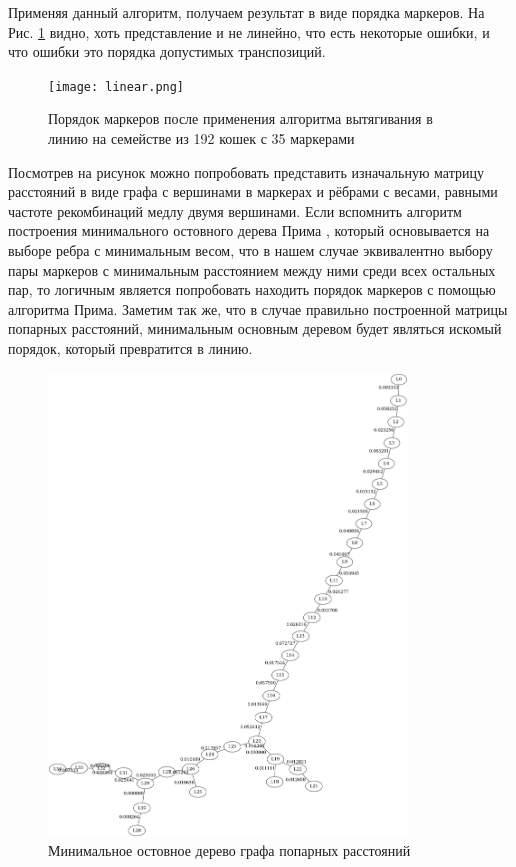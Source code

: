\documentclass{matmex-diploma-custom}
\begin{document}
Применяя данный алгоритм, получаем результат в виде порядка маркеров.
На Рис. \ref{fig:fig3} видно, хоть представление и не линейно, что
есть некоторые ошибки, и что ошибки это порядка допустимых
транспозиций.
\begin{figure}[h]
 \centering
  \texttt{[image: linear.png]}
  \caption[width=0.4\textwidth]{Порядок маркеров после применения
    алгоритма вытягивания в линию на семействе из 192 кошек с 35 маркерами}
  \label{fig:fig3}
\end{figure}
Посмотрев на рисунок можно попробовать представить изначальную матрицу
расстояний в виде графа с вершинами в маркерах и рёбрами с весами,
равными частоте рекомбинаций медлу двумя вершинами. Если вспомнить
алгоритм построения минимального остовного дерева Прима
\cite{cormen2001introduction}, который основывается на выборе ребра с
минимальным весом, что в нашем случае эквивалентно выбору пары
маркеров с минимальным расстоянием между ними среди всех остальных
пар, то логичным является попробовать находить порядок маркеров с
помощью алгоритма Прима. Заметим так же, что в случае правильно
построенной матрицы попарных расстояний, минимальным основным деревом
будет являться искомый порядок, который превратится в линию.
\begin{figure}[h]
  \centering
  \includegraphics[width=0.85\textwidth]{prm.png}
  \caption[width=0.4\textwidth]{Минимальное остовное дерево графа
    попарных расстояний}
  \label{fig:fig4}
\end{figure}
\end{document}
